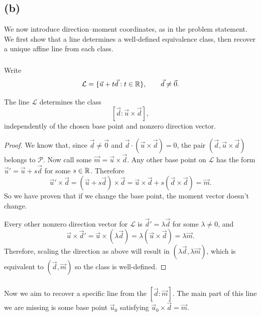 \documentclass[11pt]{scrartcl}
\begin{document}
\subsection{(b)}

\begin{soln}
	We now introduce direction--moment coordinates, as in 
    the problem statement. We first show that a line determines a
well-defined equivalence class, then recover a unique affine
line from each class.

    \subsubsection*{}

    Write
    \[
    \mathcal L=\{\vec u+t\vec d:t\in\mathbb R\},
    \qquad \vec d\neq\vec 0.
    \]

    \begin{claim*}
        The line $\mathcal L$ determines the class
        \[
        \boxed{[\vec d:\vec u\times\vec d]},
        \]
        independently of the chosen base point and nonzero direction
        vector.
    \end{claim*}

    \begin{proof}
        We know that, since  $\vec d\neq\vec 0$ and
        $\vec d\cdot(\vec u\times\vec d)=0$, the pair
        $(\vec d,\vec u\times\vec d)$ belongs to $\mathcal P$.
Now call some $\vec m=\vec u\times\vec d$.
Any other base point on $\mathcal L$ has the form
$\vec u'=\vec u+s\vec d$ for some $s\in\mathbb R$. Therefore
\[
\vec u'\times\vec d
=(\vec u+s\vec d)\times\vec d
=\vec u\times\vec d+s(\vec d\times\vec d)
=\vec m.
\]
So we have proven that if we change the base point, the moment vector doesn't change. 

Every other nonzero direction vector for $\mathcal L$ is
$\vec d'=\lambda\vec d$ for some $\lambda\neq0$, and
\[
\vec u\times\vec d'
=\vec u\times(\lambda\vec d)
=\lambda(\vec u\times\vec d)
=\lambda\vec m.
\]
Therefore, scaling the direction as above will result in
$(\lambda\vec d,\lambda\vec m)$, which is equivalent to
$(\vec d,\vec m)$ so the class is well-defined.
    \end{proof}

    \subsubsection*{}
	Now we aim to recover a specific line from the $[\vec d:\vec m]$.
	The main part of this line we are missing is some base point $\vec u_0$ satisfying
    $\vec u_0\times\vec d=\vec m$.


\end{soln}
\end{document}
